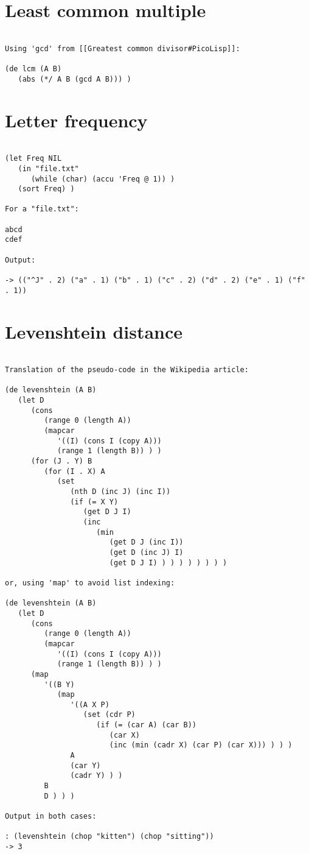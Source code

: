 \section*{Least common multiple}

\begin{verbatim}

Using 'gcd' from [[Greatest common divisor#PicoLisp]]:

(de lcm (A B)
   (abs (*/ A B (gcd A B))) )

\end{verbatim}

\section*{Letter frequency}

\begin{verbatim}

(let Freq NIL
   (in "file.txt"
      (while (char) (accu 'Freq @ 1)) )
   (sort Freq) )

For a "file.txt":

abcd
cdef

Output:

-> (("^J" . 2) ("a" . 1) ("b" . 1) ("c" . 2) ("d" . 2) ("e" . 1) ("f" . 1))

\end{verbatim}

\section*{Levenshtein distance}

\begin{verbatim}

Translation of the pseudo-code in the Wikipedia article:

(de levenshtein (A B)
   (let D
      (cons
         (range 0 (length A))
         (mapcar
            '((I) (cons I (copy A)))
            (range 1 (length B)) ) )
      (for (J . Y) B
         (for (I . X) A
            (set
               (nth D (inc J) (inc I))
               (if (= X Y)
                  (get D J I)
                  (inc
                     (min
                        (get D J (inc I))
                        (get D (inc J) I)
                        (get D J I) ) ) ) ) ) ) ) )

or, using 'map' to avoid list indexing:

(de levenshtein (A B)
   (let D
      (cons
         (range 0 (length A))
         (mapcar
            '((I) (cons I (copy A)))
            (range 1 (length B)) ) )
      (map
         '((B Y)
            (map
               '((A X P)
                  (set (cdr P)
                     (if (= (car A) (car B))
                        (car X)
                        (inc (min (cadr X) (car P) (car X))) ) ) )
               A
               (car Y)
               (cadr Y) ) )
         B
         D ) ) )

Output in both cases:

: (levenshtein (chop "kitten") (chop "sitting"))
-> 3

\end{verbatim}

